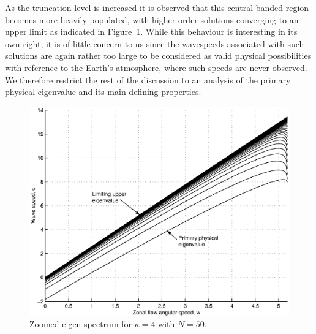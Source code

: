 As the truncation level is increased it is observed that this central banded region becomes more heavily populated, with higher order solutions converging to an upper limit as indicated in Figure~\ref{fig:wvcincompzoom}. While this behaviour is interesting in its own right, it is of little concern to us since the wavespeeds associated with such solutions are again rather too large to be considered as valid physical possibilities with reference to the Earth's atmosphere, where such speeds are never observed. We therefore restrict the rest of the discussion to an analysis of the primary physical eigenvalue and its main defining properties. 
\begin{figure}[htbp]
	\centering
		\includegraphics[scale=0.7]{IMAGES/kappa4zoomspectrumN50.eps}
	\caption{Zoomed eigen-spectrum for $\kappa=4$ with $N=50$.}
	\label{fig:wvcincompzoom}
\end{figure}

